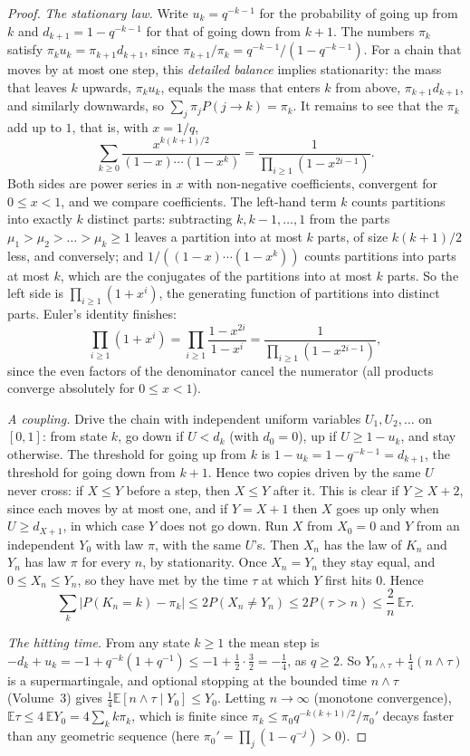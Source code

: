 \begin{proof}
\emph{The stationary law.} Write $u_k=q^{-k-1}$ for the probability of going up from $k$ and $d_{k+1}=1-q^{-k-1}$ for that of going down from $k+1$. The numbers $\pi_k$ satisfy $\pi_ku_k=\pi_{k+1}d_{k+1}$, since $\pi_{k+1}/\pi_k=q^{-k-1}/(1-q^{-k-1})$. For a chain that moves by at most one step, this \emph{detailed balance} implies stationarity: the mass that leaves $k$ upwards, $\pi_ku_k$, equals the mass that enters $k$ from above, $\pi_{k+1}d_{k+1}$, and similarly downwards, so $\sum_j\pi_jP(j\to k)=\pi_k$. It remains to see that the $\pi_k$ add up to $1$, that is, with $x=1/q$,
\[
\sum_{k\ge0}\frac{x^{k(k+1)/2}}{(1-x)\cdots(1-x^k)}=\frac1{\prod_{i\ge1}(1-x^{2i-1})}.
\]
Both sides are power series in $x$ with non-negative coefficients, convergent for $0\le x<1$, and we compare coefficients. The left-hand term $k$ counts partitions into exactly $k$ distinct parts: subtracting $k,k-1,\dots,1$ from the parts $\mu_1>\mu_2>\dots>\mu_k\ge1$ leaves a partition into at most $k$ parts, of size $k(k+1)/2$ less, and conversely; and $1/((1-x)\cdots(1-x^k))$ counts partitions into parts at most $k$, which are the conjugates of the partitions into at most $k$ parts. So the left side is $\prod_{i\ge1}(1+x^i)$, the generating function of partitions into distinct parts. Euler's identity finishes:
\[
\prod_{i\ge1}(1+x^i)=\prod_{i\ge1}\frac{1-x^{2i}}{1-x^i}=\frac1{\prod_{i\ge1}(1-x^{2i-1})},
\]
since the even factors of the denominator cancel the numerator (all products converge absolutely for $0\le x<1$).

\emph{A coupling.} Drive the chain with independent uniform variables $U_1,U_2,\dots$ on $[0,1]$: from state $k$, go down if $U<d_k$ (with $d_0=0$), up if $U\ge1-u_k$, and stay otherwise. The threshold for going up from $k$ is $1-u_k=1-q^{-k-1}=d_{k+1}$, the threshold for going down from $k+1$. Hence two copies driven by the same $U$ never cross: if $X\le Y$ before a step, then $X\le Y$ after it. This is clear if $Y\ge X+2$, since each moves by at most one, and if $Y=X+1$ then $X$ goes up only when $U\ge d_{X+1}$, in which case $Y$ does not go down. Run $X$ from $X_0=0$ and $Y$ from an independent $Y_0$ with law $\pi$, with the same $U$'s. Then $X_n$ has the law of $K_n$ and $Y_n$ has law $\pi$ for every $n$, by stationarity. Once $X_n=Y_n$ they stay equal, and $0\le X_n\le Y_n$, so they have met by the time $\tau$ at which $Y$ first hits $0$. Hence
\[
\sum_k|P(K_n=k)-\pi_k|\le2P(X_n\ne Y_n)\le2P(\tau>n)\le\frac2n\,\mathbb E\tau.
\]

\emph{The hitting time.} From any state $k\ge1$ the mean step is $-d_k+u_k=-1+q^{-k}(1+q^{-1})\le-1+\frac12\cdot\frac32=-\frac14$, as $q\ge2$. So $Y_{n\wedge\tau}+\frac14(n\wedge\tau)$ is a supermartingale, and optional stopping at the bounded time $n\wedge\tau$ (Volume~3) gives $\frac14\mathbb E[n\wedge\tau\mid Y_0]\le Y_0$. Letting $n\to\infty$ (monotone convergence), $\mathbb E\tau\le4\,\mathbb EY_0=4\sum_kk\pi_k$, which is finite since $\pi_k\le\pi_0q^{-k(k+1)/2}/\pi_0'$ decays faster than any geometric sequence (here $\pi_0'=\prod_j(1-q^{-j})>0$).
\end{proof}

